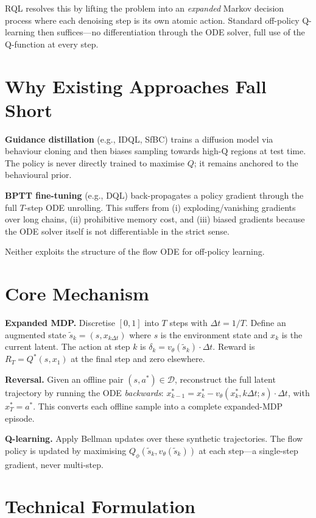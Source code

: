 \documentclass[10pt,twocolumn]{article}
\begin{document}
RQL resolves this by lifting the problem into an \emph{expanded} Markov decision
process where each denoising step is its own atomic action. Standard
off-policy Q-learning then suffices---no differentiation through the ODE solver,
full use of the Q-function at every step.

\section{Why Existing Approaches Fall Short}

\textbf{Guidance distillation} (e.g., IDQL, SfBC) trains a diffusion model via
behaviour cloning and then biases sampling towards high-Q regions at test time.
The policy is never directly trained to maximise $Q$; it remains anchored to the
behavioural prior.

\textbf{BPTT fine-tuning} (e.g., DQL) back-propagates a policy gradient through
the full $T$-step ODE unrolling. This suffers from (i) exploding/vanishing
gradients over long chains, (ii) prohibitive memory cost, and (iii) biased
gradients because the ODE solver itself is not differentiable in the strict sense.

Neither exploits the structure of the flow ODE for off-policy learning.

\section{Core Mechanism}

\textbf{Expanded MDP.}
Discretise $[0,1]$ into $T$ steps with $\Delta t=1/T$. Define an augmented
state $\tilde s_k=(s,x_{k\Delta t})$ where $s$ is the environment state and
$x_k$ is the current latent. The action at step $k$ is $\delta_k =
v_\theta(\tilde s_k)\cdot\Delta t$. Reward is $R_T = Q^*(s,x_1)$ at the
final step and zero elsewhere.

\textbf{Reversal.}
Given an offline pair $(s,a^*)\in\mathcal D$, reconstruct the full latent
trajectory by running the ODE \emph{backwards}:
$x_{k-1}^* = x_k^* - v_\theta(x_k^*,k\Delta t; s)\cdot\Delta t$,
with $x_T^* = a^*$. This converts each offline sample into a complete
expanded-MDP episode.

\textbf{Q-learning.}
Apply Bellman updates over these synthetic trajectories. The flow policy is
updated by maximising $Q_\phi(\tilde s_k, v_\theta(\tilde s_k))$ at each
step---a single-step gradient, never multi-step.

\section{Technical Formulation}
\end{document}
